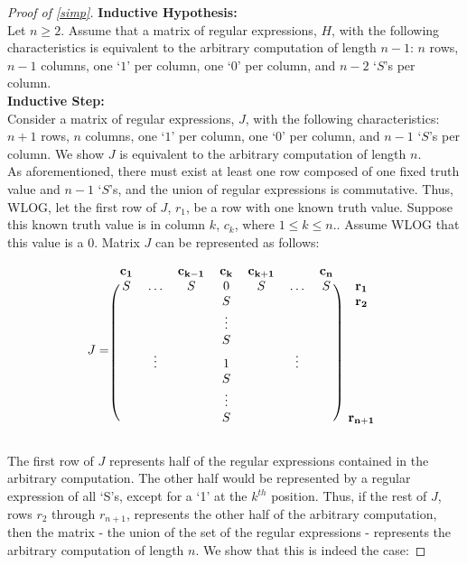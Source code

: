 \documentclass[runningheads]{llncs}
\begin{document}
\begin{proof}[Proof of \ref{simp}]
\noindent \textbf{Inductive Hypothesis:}\\
Let $n\geq 2$. Assume that a matrix of regular expressions, $H$, with the following characteristics is equivalent to the arbitrary computation of length $n-1$: $n$ rows, $n-1$ columns, one `$1$' per column, one `$0$' per column, and $n-2$ `$S$'s per column.\\
\noindent \textbf{Inductive Step:}\\
Consider a matrix of regular expressions, $J$, with the following characteristics: $n+1$ rows, $n$ columns, one `$1$' per column, one `$0$' per column, and $n-1$ `$S$'s per column. We show $J$ is equivalent to the arbitrary computation of length $n$.\\

As aforementioned, there must exist at least one row composed of one fixed truth value and $n-1$ `$S$'s, and the union of regular expressions is commutative. Thus, WLOG, let the first row of $J$, $r_1$, be a row with one known truth value.
Suppose this known truth value is in column $k$, $c_k$, where $1 \leq k \leq n$.. Assume WLOG that this value is a 0. Matrix $J$ can be represented as follows:

\[
J = \begin{blockarray}{cccccccc}
\mathbf{c_1} & & \mathbf{c_{k-1}} & \mathbf{c_k} & \mathbf{c_{k+1}} & & \mathbf{c_n} \\
\begin{block}{(ccccccc)c}
    S & \hdots & S & 0 & S & \hdots & S & \mathbf{r_1}\\
     &  &  & S &  &  &  & \mathbf{r_2}\\
    &  &  & \vdots &  &  &  & \\
    &  & & S &  &  &  & \\
    & \vdots &  & 1 &  & \vdots &  & \\
    & &  & S &  & &  & \\
    &  &  & \vdots & &  &  & \\
    &  & & S & &  & & \mathbf{r_{n+1}}\\
\end{block}
\end{blockarray}
 \]

The first row of $J$ represents half of the regular expressions contained in the arbitrary computation. The other half would be represented by a regular expression of all `S's, except for a `1' at the $k^{th}$ position. Thus, if the rest of $J$, rows $r_2$ through $r_{n+1}$, represents the other half of the arbitrary computation, then the matrix - the union of the set of the regular expressions - represents the arbitrary computation of length $n$. We show that this is indeed the case:


\end{proof}
\end{document}
